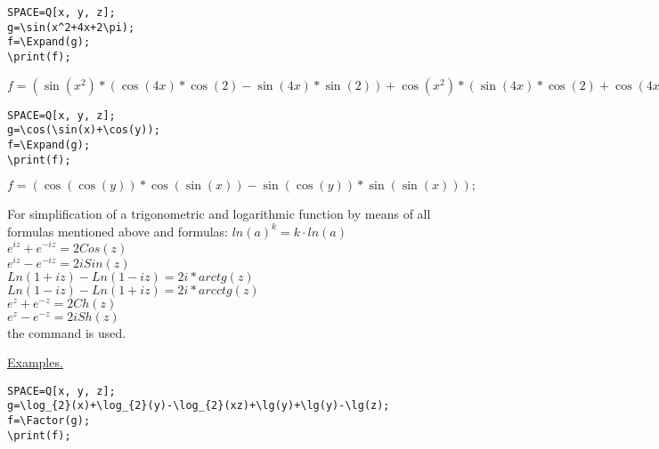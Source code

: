 \begin{verbatim}
SPACE=Q[x, y, z]; 
g=\sin(x^2+4x+2\pi); 
f=\Expand(g); 
\print(f);
\end{verbatim}\vspace*{-3mm}

{\hspace*{4mm} $f=(\sin(x^2)*(\cos(4x)*\cos(2)-\sin(4x)*\sin(2))+\cos(x^2)*(\sin(4x)*\cos(2)+\cos(4x)*\sin(2)));$} 

\begin{verbatim}
SPACE=Q[x, y, z]; 
g=\cos(\sin(x)+\cos(y)); 
f=\Expand(g); 
\print(f);
\end{verbatim}\vspace*{-3mm}


{\hspace*{4mm} $f=(\cos(\cos(y))*\cos(\sin(x))-\sin(\cos(y))*\sin(\sin(x)));$}

For simplification of a trigonometric and logarithmic function by means of all formulas mentioned above and formulas:
$ln(a)^k = k\cdot ln(a)$\\
$e^{iz} + e^{-iz} = 2Cos(z)$\\
$e^{iz} - e^{-iz} = 2iSin(z)$\\
$Ln(1+iz) - Ln(1-iz) = 2i*arctg(z)$\\
$Ln(1-iz) - Ln(1+iz) = 2i*arcctg(z)$\\
$e^{z} + e^{-z} = 2Ch(z)$\\
$e^{z} - e^{-z} = 2iSh(z)$\\
the command   is used.

\smallskip
\underline{Examples. }

\begin{verbatim}
SPACE=Q[x, y, z]; 
g=\log_{2}(x)+\log_{2}(y)-\log_{2}(xz)+\lg(y)+\lg(y)-\lg(z); 
f=\Factor(g); 
\print(f);
\end{verbatim}

